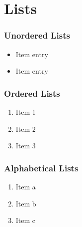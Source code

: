 



\chapter{Lists} \label{lists}

\subsection{Unordered Lists} \label{unordered-lists}

\begin{itemize}
	\item Item entry
	\item Item entry
\end{itemize}

\subsection{Ordered Lists} \label{ordered-lists}

\begin{enumerate}
	\item Item 1
	\item Item 2
	\item Item 3
\end{enumerate}

\subsection{Alphabetical Lists} \label{alphabetical-list}

\begin{enumerate}[label=(\alph*)]
	\item Item a
	\item Item b
	\item Item c
\end{enumerate}

